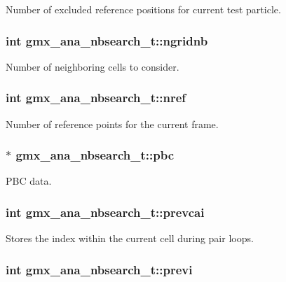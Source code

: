 \-Number of excluded reference positions for current test particle. \hypertarget{structgmx__ana__nbsearch__t_a41b50f5d8fadee8e83ed21bd2071ca4b}{
\subsubsection[{ngridnb}]{\setlength{\rightskip}{0pt plus 5cm}int {\bf gmx\-\_\-ana\-\_\-nbsearch\-\_\-t\-::ngridnb}}}\label{structgmx__ana__nbsearch__t_a41b50f5d8fadee8e83ed21bd2071ca4b}
\-Number of neighboring cells to consider. \hypertarget{structgmx__ana__nbsearch__t_a4bf250483f5bdc6dc83a3c12f1650740}{
\subsubsection[{nref}]{\setlength{\rightskip}{0pt plus 5cm}int {\bf gmx\-\_\-ana\-\_\-nbsearch\-\_\-t\-::nref}}}\label{structgmx__ana__nbsearch__t_a4bf250483f5bdc6dc83a3c12f1650740}
\-Number of reference points for the current frame. \hypertarget{structgmx__ana__nbsearch__t_ad3dafea415ba4d8e5bdfe93cb04a38c9}{
\subsubsection[{pbc}]{$\ast$ {\bf gmx\-\_\-ana\-\_\-nbsearch\-\_\-t\-::pbc}}}\label{structgmx__ana__nbsearch__t_ad3dafea415ba4d8e5bdfe93cb04a38c9}
\-P\-B\-C data. \hypertarget{structgmx__ana__nbsearch__t_ae1c4ab46df3ecdd39b9afcdaffcb4b5b}{
\subsubsection[{prevcai}]{\setlength{\rightskip}{0pt plus 5cm}int {\bf gmx\-\_\-ana\-\_\-nbsearch\-\_\-t\-::prevcai}}}\label{structgmx__ana__nbsearch__t_ae1c4ab46df3ecdd39b9afcdaffcb4b5b}
\-Stores the index within the current cell during pair loops. \hypertarget{structgmx__ana__nbsearch__t_a8f6a006d012062a1ef0ed018a9a1d18d}{
\subsubsection[{previ}]{\setlength{\rightskip}{0pt plus 5cm}int {\bf gmx\-\_\-ana\-\_\-nbsearch\-\_\-t\-::previ}}}\label{structgmx__ana__nbsearch__t_a8f6a006d012062a1ef0ed018a9a1d18d}
